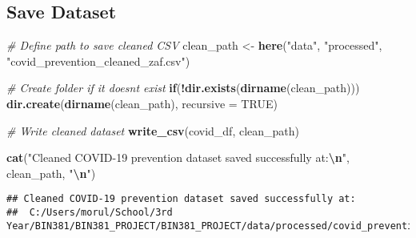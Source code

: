 \documentclass[
]{article}
\newenvironment{Shaded}{\begin{snugshade}}{\end{snugshade}}
\newcommand{\AttributeTok}[1]{\textcolor[rgb]{0.13,0.29,0.53}{#1}}
\newcommand{\CommentTok}[1]{\textcolor[rgb]{0.56,0.35,0.01}{\textit{#1}}}
\newcommand{\ConstantTok}[1]{\textcolor[rgb]{0.56,0.35,0.01}{#1}}
\newcommand{\ControlFlowTok}[1]{\textcolor[rgb]{0.13,0.29,0.53}{\textbf{#1}}}
\newcommand{\FunctionTok}[1]{\textcolor[rgb]{0.13,0.29,0.53}{\textbf{#1}}}
\newcommand{\NormalTok}[1]{#1}
\newcommand{\OtherTok}[1]{\textcolor[rgb]{0.56,0.35,0.01}{#1}}
\newcommand{\SpecialCharTok}[1]{\textcolor[rgb]{0.81,0.36,0.00}{\textbf{#1}}}
\newcommand{\StringTok}[1]{\textcolor[rgb]{0.31,0.60,0.02}{#1}}
\begin{document}
\subsection{Save Dataset}\label{save-dataset}

\begin{Shaded}
\begin{Highlighting}[]
\CommentTok{\# Define path to save cleaned CSV}
\NormalTok{clean\_path }\OtherTok{\textless{}{-}} \FunctionTok{here}\NormalTok{(}\StringTok{"data"}\NormalTok{, }\StringTok{"processed"}\NormalTok{, }\StringTok{"covid\_prevention\_cleaned\_zaf.csv"}\NormalTok{)}

\CommentTok{\# Create folder if it doesn\textquotesingle{}t exist}
\ControlFlowTok{if}\NormalTok{(}\SpecialCharTok{!}\FunctionTok{dir.exists}\NormalTok{(}\FunctionTok{dirname}\NormalTok{(clean\_path))) }\FunctionTok{dir.create}\NormalTok{(}\FunctionTok{dirname}\NormalTok{(clean\_path), }\AttributeTok{recursive =} \ConstantTok{TRUE}\NormalTok{)}

\CommentTok{\# Write cleaned dataset}
\FunctionTok{write\_csv}\NormalTok{(covid\_df, clean\_path)}

\FunctionTok{cat}\NormalTok{(}\StringTok{"Cleaned COVID{-}19 prevention dataset saved successfully at:}\SpecialCharTok{\textbackslash{}n}\StringTok{"}\NormalTok{, clean\_path, }\StringTok{"}\SpecialCharTok{\textbackslash{}n}\StringTok{"}\NormalTok{)}
\end{Highlighting}
\end{Shaded}

\begin{verbatim}
## Cleaned COVID-19 prevention dataset saved successfully at:
##  C:/Users/morul/School/3rd Year/BIN381/BIN381_PROJECT/BIN381_PROJECT/data/processed/covid_prevention_cleaned_zaf.csv
\end{verbatim}
\end{document}
